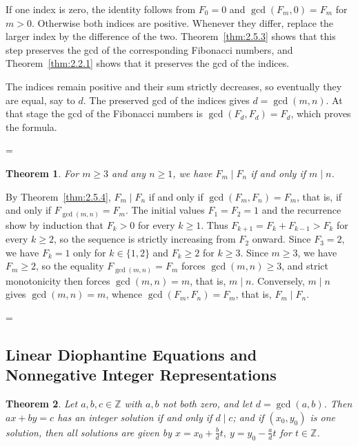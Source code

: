 \documentclass[11pt]{article}
\makeatletter
\theoremstyle{ntstyle}
\newtheorem{theorem}{Theorem}[subsection]
\let\nt@closedisplay\]
\def\nt@guardedclose{\@ifnextchar\par{\nt@closeafterpar}{\@ifnextchar\end{\postdisplaypenalty\@M\nt@closedisplay}{\nt@closedisplay}}}
\def\nt@closeafterpar\par{\@ifnextchar\par{\nt@closeafterpar}{\@ifnextchar\end{\postdisplaypenalty\@M\nt@closedisplay\par}{\nt@closedisplay\par}}}
\renewenvironment{proof}[1][\proofname]{\par
  \pushQED{\qed}\normalfont\topsep\medskipamount\edef\nt@afterproof{\@endparpenalty=\the\@endparpenalty\relax}\@beginparpenalty\@M\@endparpenalty\@M\let\]\nt@guardedclose\trivlist\item[]\textit{#1\@addpunct{.}} \ignorespaces}{\ifvmode\addpenalty\@M\fi\popQED\nt@afterproof\endtrivlist\@endpefalse}
\makeatother
\begin{document}
\begin{proof}
If one index is zero, the identity follows from
    $F_0=0$ and $\gcd(F_m,0)=F_m$ for $m>0$.
    Otherwise both indices are positive. Whenever they differ, replace
    the larger index by the difference of the two. Theorem~\ref{thm:2.5.3}
    shows that this step preserves the gcd of the corresponding
    Fibonacci numbers, and Theorem~\ref{thm:2.2.1} shows that it preserves
    the gcd of the indices.

    The indices remain positive and their sum strictly decreases, so
    eventually they are equal, say to $d$. The preserved gcd of the
    indices gives $d=\gcd(m,n)$. At that stage the gcd of the Fibonacci
    numbers is $\gcd(F_d,F_d)=F_d$, which proves the formula.

\end{proof}
\begin{theorem}\label{thm:2.5.5} For $m
		\ge 3$ and any $n \ge 1$, we have $F_m \mid F_n$ if and only if $m \mid n$.

\end{theorem}

\begin{proof} By Theorem~\ref{thm:2.5.4}, $F_m \mid F_n$ if and only if
		$\gcd(F_m, F_n) = F_m$, that is, if and only if $F_{\gcd(m, n)} = F_m$. The initial values $F_1 = F_2 = 1$ and the recurrence show by induction that
	$F_k>0$ for every $k\ge1$. Thus
	$F_{k+1} = F_k + F_{k-1} > F_k$ for every $k \ge 2$, so
	the sequence is strictly increasing from $F_2$ onward. Since $F_3 = 2$,
	we have $F_k = 1$ only for $k \in \{1, 2\}$ and $F_k \ge 2$ for $k \ge 3$. Since $m \ge 3$, we have $F_m \ge 2$, so
	the equality $F_{\gcd(m, n)} = F_m$ forces $\gcd(m, n) \ge 3$, and
	strict monotonicity then forces $\gcd(m, n) = m$, that is, $m \mid n$.
	Conversely, $m \mid n$ gives $\gcd(m, n) = m$, whence $\gcd(F_m, F_n)
		= F_m$, that is, $F_m \mid F_n$.

\end{proof}
\subsection{Linear Diophantine Equations and Nonnegative Integer Representations}

\begin{theorem}\label{thm:2.6.1}
	Let $a,b,c\in\mathbb{Z}$ with $a,b$ not both zero, and let $d=\gcd(a, b)$. Then
	$ax+by=c$ has an integer solution if and only if $d\mid c$; and if $(x_0,y_0)$
	is one solution, then all solutions are given by
	$x=x_0+\tfrac{b}{d}t,\ y=y_0-\tfrac{a}{d}t$ for $t\in\mathbb{Z}$.

\end{theorem}
\end{document}
